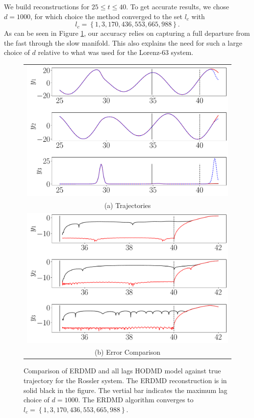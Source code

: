 \documentclass[a4paper,11pt]{article}
\begin{document}
We build reconstructions for $25\leq t \leq 40$.  To get accurate results, we chose $d=1000$, for which choice the method converged to the set $l_{c}$ with
\[
l_{c} = \left\{1, 3, 170, 436, 553, 665, 988\right\}.
\]
As can be seen in Figure \ref{fig:rossler}, our accuracy relies on capturing a full departure from the fast through the slow manifold.  This also explains the need for such a large choice of $d$ relative to what was used for the Lorenz-63 system.  
\begin{figure}[!h]
\centering
\begin{tabular}{c}
\includegraphics[width=.8\textwidth]{Rossler_compare_w_mx_lag_1000}\\
(a) Trajectories \\
\includegraphics[width=.8\textwidth]{Rossler_error_compare_w_mx_lag_1000}\\
(b) Error Comparison
\end{tabular}
\caption{Comparison of ERDMD and all lags HODMD model against true trajectory for the Rossler system.  The ERDMD reconstruction is in solid black in the figure.  The vertial bar indicates the maximum lag choice of $d=1000$. The ERDMD algorithm converges to $l_{c}=\left\{1, 3, 170, 436, 553, 665, 988\right\}$.}
\label{fig:rossler}
\end{figure}
\end{document}
